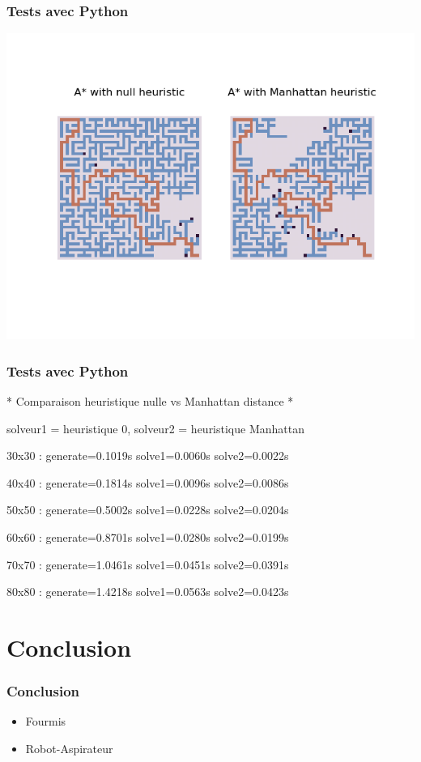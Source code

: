 \documentclass[]{beamer}
\begin{document}
\begin{frame}
  \frametitle{Tests avec Python}
  \includegraphics[width=.9\linewidth]{manhattan_vs_null.png}
\end{frame}

\begin{frame}
  \frametitle{Tests avec Python}
  \begin{semiverbatim}
    * Comparaison heuristique nulle vs Manhattan distance *
    
    solveur1 = heuristique 0, solveur2 = heuristique Manhattan
    
    30x30  : generate=0.1019s solve1=0.0060s solve2=0.0022s
    
    40x40  : generate=0.1814s solve1=0.0096s solve2=0.0086s
    
    50x50  : generate=0.5002s solve1=0.0228s solve2=0.0204s
    
    60x60  : generate=0.8701s solve1=0.0280s solve2=0.0199s
    
    70x70  : generate=1.0461s solve1=0.0451s solve2=0.0391s
    
    80x80  : generate=1.4218s solve1=0.0563s solve2=0.0423s
  \end{semiverbatim}
\end{frame}

\section{Conclusion}
\begin{frame}
  \frametitle{Conclusion}
  \begin{itemize}
  \item Fourmis
  \item Robot-Aspirateur
  \end{itemize}
\end{frame}
\end{document}
